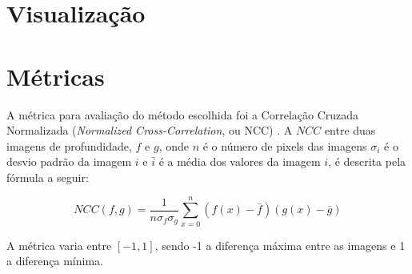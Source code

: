 \documentclass[cic,tc]{iiufrgs}
\begin{document}
\section{Visualização}


\section{Métricas}

A métrica para avaliação do método escolhida foi a Correlação Cruzada Normalizada (\textit{Normalized Cross-Correlation}, ou NCC) \citep{NCC2006}. A $NCC$ entre duas imagens de profundidade, $f$ e $g$, onde $n$ é o número de pixels das imagens $\sigma_i$ é o desvio padrão da imagem $i$ e $\bar{i}$ é a média dos valores da imagem $i$, é descrita pela fórmula a seguir:

$$NCC(f,g) = \frac{1}{n \sigma_f \sigma_g}\sum_{x=0}^{n}(f(x)-\bar{f})(g(x)-\bar{g})$$

A métrica varia entre $[-1,1]$, sendo -1 a diferença máxima entre as imagens e 1 a diferença mínima.
\end{document}
